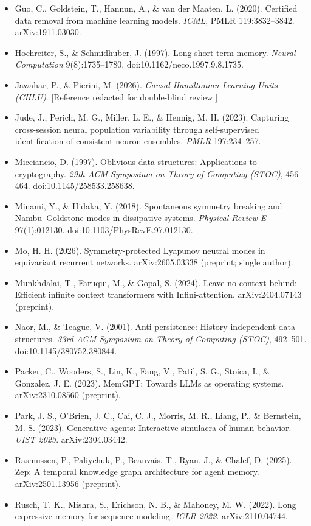 \documentclass{article}
\begin{document}
{\begin{itemize}
\item Guo, C., Goldstein, T., Hannun, A., \& van der Maaten, L. (2020). Certified data removal from machine learning models. \emph{ICML}, PMLR 119:3832--3842. arXiv:1911.03030.
\item Hochreiter, S., \& Schmidhuber, J. (1997). Long short-term memory. \emph{Neural Computation} 9(8):1735--1780. doi:10.1162/neco.1997.9.8.1735.
\item Jawahar, P., \& Pierini, M. (2026). \emph{Causal Hamiltonian Learning Units (CHLU)}. [Reference redacted for double-blind review.]
\item Jude, J., Perich, M. G., Miller, L. E., \& Hennig, M. H. (2023). Capturing cross-session neural population variability through self-supervised identification of consistent neuron ensembles. \emph{PMLR} 197:234--257.
\item Micciancio, D. (1997). Oblivious data structures: Applications to cryptography. \emph{29th ACM Symposium on Theory of Computing (STOC)}, 456--464. doi:10.1145/258533.258638.
\item Minami, Y., \& Hidaka, Y. (2018). Spontaneous symmetry breaking and Nambu--Goldstone modes in dissipative systems. \emph{Physical Review E} 97(1):012130. doi:10.1103/PhysRevE.97.012130.
\item Mo, H. H. (2026). Symmetry-protected Lyapunov neutral modes in equivariant recurrent networks. arXiv:2605.03338 (preprint; single author).
\item Munkhdalai, T., Faruqui, M., \& Gopal, S. (2024). Leave no context behind: Efficient infinite context transformers with Infini-attention. arXiv:2404.07143 (preprint).
\item Naor, M., \& Teague, V. (2001). Anti-persistence: History independent data structures. \emph{33rd ACM Symposium on Theory of Computing (STOC)}, 492--501. doi:10.1145/380752.380844.
\item Packer, C., Wooders, S., Lin, K., Fang, V., Patil, S. G., Stoica, I., \& Gonzalez, J. E. (2023). MemGPT: Towards LLMs as operating systems. arXiv:2310.08560 (preprint).
\item Park, J. S., O'Brien, J. C., Cai, C. J., Morris, M. R., Liang, P., \& Bernstein, M. S. (2023). Generative agents: Interactive simulacra of human behavior. \emph{UIST 2023}. arXiv:2304.03442.
\item Rasmussen, P., Paliychuk, P., Beauvais, T., Ryan, J., \& Chalef, D. (2025). Zep: A temporal knowledge graph architecture for agent memory. arXiv:2501.13956 (preprint).
\item Rusch, T. K., Mishra, S., Erichson, N. B., \& Mahoney, M. W. (2022). Long expressive memory for sequence modeling. \emph{ICLR 2022}. arXiv:2110.04744.

\end{itemize}}
\end{document}
